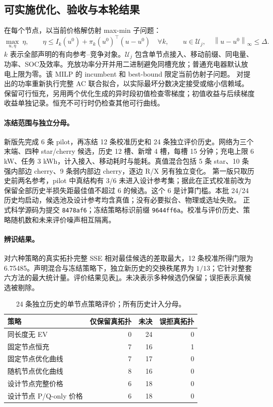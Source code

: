 \documentclass[UTF8,fontset=fandol,11pt,a4paper]{ctexart}
\newcommand{\norm}[1]{\left\lVert#1\right\rVert}
\begin{document}
\subsection{可实施优化、验收与本轮结果}
在每个节点，以当前价格解仿射 max-min 子问题：
\begin{equation}
\max_{u,\eta}\ \eta,\qquad
\eta\le I_k(u^0)+\pi_k(u^0)^\top(u-u^0)\quad\forall k,
\qquad u\in\mathcal U_j,\quad\norm{u-u^0}_\infty\le\Delta.
\label{eq:gp-master}
\end{equation}
$k$ 表示全部声明的有向参考--竞争对象。$\mathcal U_j$ 包含单节点接入、移动前缀、同电量、功率、SOC及效率。充放功率分开并用二进制避免同槽充放；普通充电器默认放电上限为零。该 MILP 的 incumbent 和 best-bound 限定当前仿射子问题。
对提出的功率重新执行完整 AC 联合拟合，以实际最坏分数决定接受或缩小信赖域。保留可行恒充，另用两个优化生成的异时段初值检查零梯度；初值收益与后续梯度收益单独记录。恒充不可行时仍检查其他可行曲线。

\paragraph{冻结范围与独立分母。}
新版先完成 6 条 pilot，再冻结 12 条校准历史和 24 条独立评价历史。网络为三个末端、四种 star/cherry 候选，历史 12 槽、新增 4 槽，每槽 15 分钟；充电上限 6 kW、任务 3 kWh，计入接入、移动耗时与能耗。真值混合包括 5 条 star、10 条强内部边 cherry、9 条弱内部边 cherry，逐边 R/X 另有独立变化。
第一版只取历史前两名参考，pilot 中真结构有 3/6 未进入设计参考集；据此在正式校准前改为保留全部历史半损失距最佳值不超过 6 的候选。这个 6 是计算门槛。本批 24/24 历史均启动，候选池及设计参考均含真值；没有必要拟合、物理或选址失败。
正式科学源码为提交 \texttt{8478af6}；冻结策略标识前缀 \texttt{9644ff6a}。校准与评价历史、策略随机数和未来评价噪声相互隔离。

\paragraph{辨识结果。}
对六种策略的真实拓扑完整 SSE 相对最佳候选的差取最大，12 条校准所得门限为 6.75485。声明混合与冻结策略下，独立新历史的交换秩尾界为 $1/13$；它针对整套六方法的最大统计量。评价结果见表\ref{tab:gp-result}。未决表示多种候选仍保留；误拒表示真候选被剔除。

\begin{table}[htbp]\centering\small
\caption{24 条独立历史的单节点策略评价；所有历史计入分母。}
\label{tab:gp-result}
\begin{tabular}{lrrr}\toprule
策略 & 仅保留真拓扑 & 未决 & 误拒真拓扑\\\midrule
同长度无 EV & 0 & 24 & 0\\
固定节点恒充 & 7 & 16 & 1\\
固定节点优化曲线 & 7 & 17 & 0\\
随机节点优化曲线 & 8 & 16 & 0\\
设计节点完整价格 & 6 & 18 & 0\\
设计节点 P/Q-only 价格 & 6 & 18 & 0\\\bottomrule
\end{tabular}
\end{table}
\end{document}
